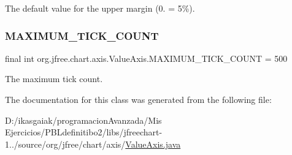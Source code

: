 The default value for the upper margin (0. = 5\%). \mbox{\label{classorg_1_1jfree_1_1chart_1_1axis_1_1_value_axis_a8d9640786e017770399d3fb4bb0fb2e1}} 
\subsubsection{\texorpdfstring{M\+A\+X\+I\+M\+U\+M\+\_\+\+T\+I\+C\+K\+\_\+\+C\+O\+U\+NT}{MAXIMUM\_TICK\_COUNT}}
{\footnotesize\ttfamily final int org.\+jfree.\+chart.\+axis.\+Value\+Axis.\+M\+A\+X\+I\+M\+U\+M\+\_\+\+T\+I\+C\+K\+\_\+\+C\+O\+U\+NT = 500\hspace{0.3cm}{\ttfamily [static]}}

The maximum tick count. 

The documentation for this class was generated from the following file\+:\begin{DoxyCompactItemize}
\item 
D\+:/ikasgaiak/programacion\+Avanzada/\+Mis Ejercicios/\+P\+B\+Ldefinitibo2/libs/jfreechart-\/1../source/org/jfree/chart/axis/\mbox{\hyperlink{_value_axis_8java}{Value\+Axis.\+java}}\end{DoxyCompactItemize}
